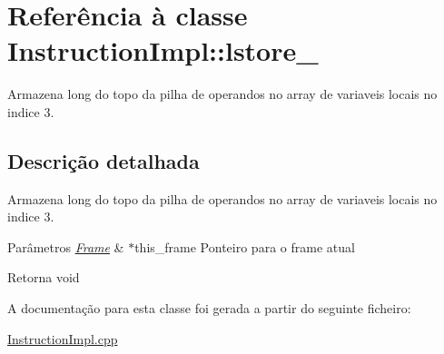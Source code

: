 \hypertarget{class_instruction_impl_1_1lstore__3}{}\section{Referência à classe Instruction\+Impl\+:\+:lstore\+\_}
\label{class_instruction_impl_1_1lstore__3}


Armazena long do topo da pilha de operandos no array de variaveis locais no indice 3.  




\subsection{Descrição detalhada}
Armazena long do topo da pilha de operandos no array de variaveis locais no indice 3. 


\begin{DoxyParams}{Parâmetros}
{\em \hyperlink{struct_frame}{Frame}} & $\ast$this\+\_\+frame Ponteiro para o frame atual \\
\hline
\end{DoxyParams}
\begin{DoxyReturn}{Retorna}
void 
\end{DoxyReturn}


A documentação para esta classe foi gerada a partir do seguinte ficheiro\+:\begin{DoxyCompactItemize}
\item 
\hyperlink{_instruction_impl_8cpp}{Instruction\+Impl.\+cpp}\end{DoxyCompactItemize}
